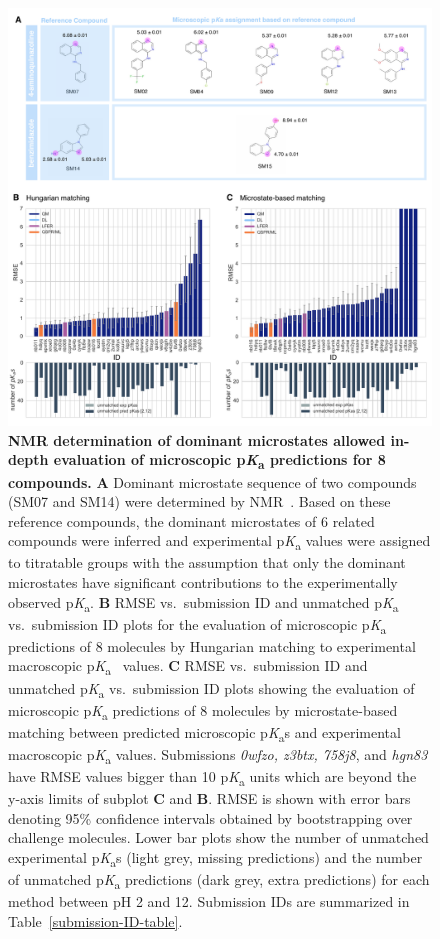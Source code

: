 \documentclass[9pt,lineno,final]{elife}
\newcommand{\pKa}{p\textit{K}\textsubscript{a}}
\begin{document}
\begin{figure}
\centering
\includegraphics[width=1.0\linewidth]{figures/typeI_8_mol_matching_comparison.pdf}
\caption{{\bf NMR determination of dominant microstates allowed in-depth evaluation of microscopic \pKa{} predictions for 8 compounds.} 
{\bf A} Dominant microstate sequence of two compounds (SM07 and SM14) were determined by NMR~\cite{Isik:2018:J.Comput.AidedMol.Des.}. 
Based on these reference compounds, the dominant microstates of 6 related compounds were inferred and experimental \pKa{} values were assigned to titratable groups with the assumption that only the dominant microstates have significant contributions to the experimentally observed \pKa{}.
{\bf B} RMSE vs.\ submission ID and unmatched \pKa{} vs.\ submission ID plots for the evaluation of microscopic \pKa{} predictions of 8 molecules by Hungarian matching to experimental macroscopic \pKa{}~ values. 
{\bf C} RMSE vs.\ submission ID and unmatched \pKa{} vs.\ submission ID plots showing the evaluation of microscopic \pKa{} predictions of 8 molecules by microstate-based matching between predicted microscopic \pKa{}s and experimental macroscopic \pKa{} values. Submissions \textit{0wfzo, z3btx, 758j8}, and \textit{hgn83} have RMSE values bigger than 10 \pKa{} units which are beyond the y-axis limits of subplot {\bf C} and {\bf B}.
RMSE is shown with error bars denoting 95\% confidence intervals obtained by bootstrapping over challenge molecules. Lower bar plots show the number of unmatched experimental \pKa{}s (light grey, missing predictions) and the number of unmatched \pKa{} predictions (dark grey, extra predictions) for each method between pH 2 and 12. Submission IDs are summarized in Table~\ref{submission-ID-table}.
}
\label{fig:typeI-matching-algorithm-comparison}
\end{figure}
\end{document}
